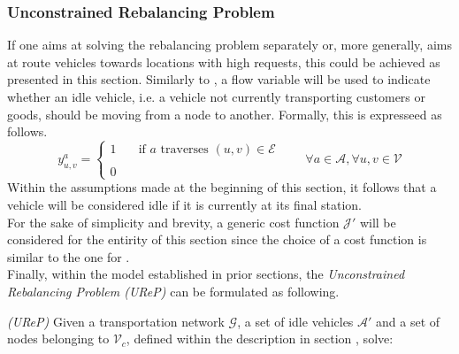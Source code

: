 \subsubsection*{Unconstrained Rebalancing Problem}
If one aims at solving the rebalancing problem separately or, more generally, aims at route vehicles towards locations with high requests, this could be achieved as presented in this section. Similarly to , a flow variable will be used to indicate whether an idle vehicle, i.e. a vehicle not currently transporting customers or goods, should be moving from a node to another. Formally, this is expresseed as follows. 
\begin{equation*}
	y_{u,v}^a = 
	\begin{cases} 
		1 & \quad \text{if $a$ traverses } (u,v) \in \mathcal{E}\\
		\\
		0
	\end{cases}
	\quad\quad \forall a \in \mathcal{A}, \forall u,v \in \mathcal{V}
	\label{eq:binary_edges_reb}
\end{equation*}
Within the assumptions made at the beginning of this section, it follows that a vehicle will be considered idle if it is currently at its final station. \\
For the sake of simplicity and brevity, a generic cost function $\mathcal{J'}$ will be considered for the entirity of this section since the choice of a cost function is similar to the one for . \\
Finally, within the model established in prior sections, the \textit{Unconstrained Rebalancing Problem (UReP)} can be formulated as following. \\
\begin{algori}{\textit{(UReP)}}
	Given a transportation network $\mathcal{G}$, a set of idle vehicles $\mathcal{A'}$ and a set of nodes belonging to $ \mathcal{V}_c$, defined within the description in section , solve:
\end{algori}





